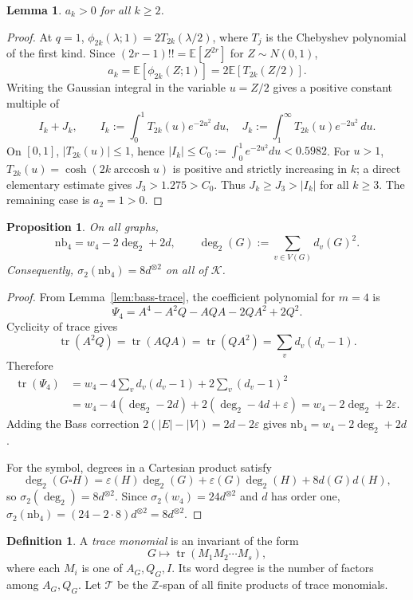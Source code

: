 \documentclass[11pt]{amsart}
\newcommand{\K}{\mathcal{K}}
\newcommand{\ZZ}{\mathbb{Z}}
\newcommand{\cT}{\mathcal{T}}
\newcommand{\tr}{\operatorname{tr}}
\newcommand{\nb}{\mathrm{nb}}
\newtheorem{proposition}[theorem]{Proposition}
\newtheorem{lemma}[theorem]{Lemma}
\theoremstyle{definition}
\newtheorem{definition}[theorem]{Definition}
\theoremstyle{remark}
\begin{document}
\begin{lemma}\label{lem:ak-positive}
$a_k>0$ for all $k\ge2$.
\end{lemma}

\begin{proof}
At $q=1$, $\phi_{2k}(\lambda;1)=2T_{2k}(\lambda/2)$, where $T_j$ is the Chebyshev polynomial of the first kind. Since $(2r-1)!!=\mathbb E[Z^{2r}]$ for $Z\sim N(0,1)$,
\[
   a_k=\mathbb E[\phi_{2k}(Z;1)]=2\mathbb E[T_{2k}(Z/2)].
\]
Writing the Gaussian integral in the variable $u=Z/2$ gives a positive constant multiple of
\[
   I_k+J_k,
   \qquad
   I_k:=\int_0^1 T_{2k}(u)e^{-2u^2}\,du,
   \quad
   J_k:=\int_1^\infty T_{2k}(u)e^{-2u^2}\,du.
\]
On $[0,1]$, $|T_{2k}(u)|\le1$, hence $|I_k|\le C_0:=\int_0^1 e^{-2u^2}du<0.5982$. For $u>1$, $T_{2k}(u)=\cosh(2k\operatorname{arccosh}u)$ is positive and strictly increasing in $k$; a direct elementary estimate gives $J_3>1.275>C_0$. Thus $J_k\ge J_3>|I_k|$ for all $k\ge3$. The remaining case is $a_2=1>0$.
\end{proof}

\begin{proposition}\label{prop:nb4}
On all graphs,
\[
   \nb_4=w_4-2\deg_2+2d,
   \qquad
   \deg_2(G):=\sum_{v\in V(G)}d_v(G)^2.
\]
Consequently, $\sigma_2(\nb_4)=8d^{\otimes2}$ on all of $\K$.
\end{proposition}

\begin{proof}
From Lemma~\ref{lem:bass-trace}, the coefficient polynomial for $m=4$ is
\[
   \Psi_4=A^4-A^2Q-AQA-2QA^2+2Q^2.
\]
Cyclicity of trace gives
\[
   \tr(A^2Q)=\tr(AQA)=\tr(QA^2)=\sum_v d_v(d_v-1).
\]
Therefore
\begin{align*}
\tr(\Psi_4)
 &=w_4-4\sum_v d_v(d_v-1)+2\sum_v(d_v-1)^2  \\
 &=w_4-4(\deg_2-2d)+2(\deg_2-4d+\varepsilon)
  =w_4-2\deg_2+2\varepsilon.
\end{align*}
Adding the Bass correction $2(|E|-|V|)=2d-2\varepsilon$ gives $\nb_4=w_4-2\deg_2+2d$.

For the symbol, degrees in a Cartesian product satisfy
\[
\deg_2(G\square H)=\varepsilon(H)\deg_2(G)+\varepsilon(G)\deg_2(H)+8d(G)d(H),
\]
so $\sigma_2(\deg_2)=8d^{\otimes2}$. Since $\sigma_2(w_4)=24d^{\otimes2}$ and $d$ has order one, $\sigma_2(\nb_4)=(24-2\cdot8)d^{\otimes2}=8d^{\otimes2}$.
\end{proof}

\begin{definition}\label{def:trace-algebra}
A \emph{trace monomial} is an invariant of the form
\[
   G\longmapsto \tr(M_1M_2\cdots M_s),
\]
where each $M_i$ is one of $A_G,Q_G,I$. Its word degree is the number of factors among $A_G,Q_G$. Let $\cT$ be the $\ZZ$-span of all finite products of trace monomials.
\end{definition}
\end{document}
